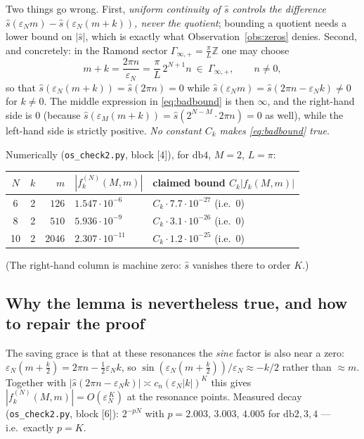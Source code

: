 \documentclass[11pt,a4paper]{article}
\theoremstyle{definition}
\newcommand{\eps}{\varepsilon}
\newcommand{\sh}{\hat{s}}
\begin{document}
Two things go wrong. First, \emph{uniform continuity of $\sh$ controls the difference
$\sh(\eps_Nm)-\sh(\eps_N(m+k))$, never the quotient}; bounding a quotient needs a lower bound
on $|\sh|$, which is exactly what Observation~\ref{obs:zeros} denies. Second, and concretely:
in the Ramond sector $\Gamma_{\infty,+}=\frac{\pi}{L}\mathbb Z$ one may choose
\[
  m+k=\frac{2\pi n}{\eps_N}=\frac{\pi}{L}\,2^{N+1}n\ \in\ \Gamma_{\infty,+},\qquad n\neq0,
\]
so that $\sh(\eps_N(m+k))=\sh(2\pi n)=0$ while $\sh(\eps_N m)=\sh(2\pi n-\eps_Nk)\neq0$ for
$k\neq0$. The middle expression in \eqref{eq:badbound} is then $\infty$, and the right-hand
side is $0$ (because $\sh(\eps_M(m+k))=\sh(2^{N-M}\!\cdot\!2\pi n)=0$ as well), while the
left-hand side is strictly positive. \emph{No constant $C_k$ makes \eqref{eq:badbound} true.}

\medskip\noindent
Numerically (\texttt{os\_check2.py}, block [4]), for $\mathrm{db}4$, $M=2$, $L=\pi$:

\begin{center}\small
\begin{tabular}{ccrll}
\toprule
$N$ & $k$ & $m$ & $|f^{(N)}_k(M,m)|$ & claimed bound $C_k|f_k(M,m)|$\\
\midrule
6 & 2 & $126$    & $1.547\cdot10^{-6}$  & $C_k\cdot 7.7\cdot10^{-27}$ (i.e.\ $0$)\\
8 & 2 & $510$    & $5.936\cdot10^{-9}$  & $C_k\cdot 3.1\cdot10^{-26}$ (i.e.\ $0$)\\
10& 2 & $2046$   & $2.307\cdot10^{-11}$ & $C_k\cdot 1.2\cdot10^{-25}$ (i.e.\ $0$)\\
\bottomrule
\end{tabular}
\end{center}
(The right-hand column is machine zero: $\sh$ vanishes there to order $K$.)

\subsection{Why the lemma is nevertheless true, and how to repair the proof}

The saving grace is that at these resonances the \emph{sine} factor is also near a zero:
$\eps_N(m+\tfrac k2)=2\pi n-\tfrac12\eps_Nk$, so
$\sin(\eps_N(m+\tfrac k2))/\eps_N\approx -k/2$ rather than $\approx m$. Together with
$|\sh(2\pi n-\eps_Nk)|\asymp c_n(\eps_N|k|)^K$ this gives
$|f^{(N)}_k(M,m)|=O(\eps_N^{\,K})$ at the resonance points. Measured decay
(\texttt{os\_check2.py}, block [6]): $2^{-pN}$ with $p=2.003,\,3.003,\,4.005$ for
$\mathrm{db}2,3,4$ --- i.e.\ exactly $p=K$.
\end{document}
